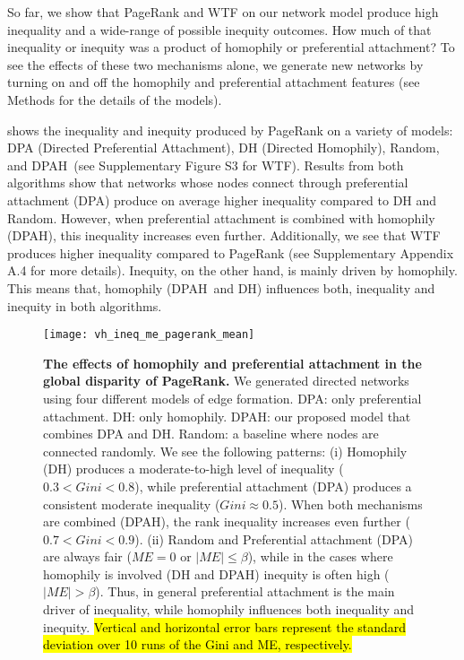 \documentclass[fleqn,10pt]{wlscirep}
\begin{document}
So far, we show that PageRank and WTF on our network model produce high inequality and a wide-range of possible inequity outcomes. 
How much of that inequality or inequity was a product of homophily or preferential attachment? 
To see the effects of these two mechanisms alone, we generate new networks by turning on and off the homophily and preferential attachment features (see Methods for the details of the models).  %

 shows the inequality and inequity produced by PageRank on a variety of models: DPA (Directed Preferential Attachment), DH (Directed Homophily), Random, and {DPAH}~(see Supplementary Figure S3 for WTF). 
Results from both algorithms show that networks whose nodes connect through preferential attachment (DPA) produce on average higher inequality compared to DH and Random. However, when preferential attachment is combined with homophily ({DPAH}), this inequality increases even further. Additionally, we see that WTF produces higher inequality compared to PageRank (see Supplementary Appendix A.4 for more details). Inequity, on the other hand, is mainly driven by homophily. This means that, homophily ({DPAH}~and DH) influences both, inequality and inequity in both algorithms. 


\begin{figure}[ht]
    \centering
    \texttt{[image: vh\_ineq\_me\_pagerank\_mean]}
    \caption{\textbf{The effects of homophily and preferential attachment in the global disparity of PageRank.} We generated directed networks using four different models of edge formation. DPA: only preferential attachment. DH: only homophily. {DPAH}: our proposed model that combines DPA and DH. Random: a baseline where nodes are connected randomly. 
    We see the following patterns: 
    (i) Homophily (DH) produces a moderate-to-high level of inequality ($0.3<Gini<0.8$), while preferential attachment (DPA) produces a consistent moderate inequality ($Gini\approx0.5$). When both mechanisms are combined (DPAH), the rank inequality increases even further ($0.7<Gini<0.9$).
    (ii) Random and Preferential attachment (DPA) are always fair ($ME=0$ or $|ME|\leq \beta$), while in the cases where homophily is involved (DH and DPAH) inequity is often high ($|ME|>\beta$).
    Thus, in general preferential attachment is the main driver of inequality, while homophily influences both inequality and inequity. 
    \hl{Vertical and horizontal error bars represent the standard deviation over 10 runs of the Gini and ME, respectively.}}
    \label{fig:vh_pagerank}
\end{figure}
\end{document}
